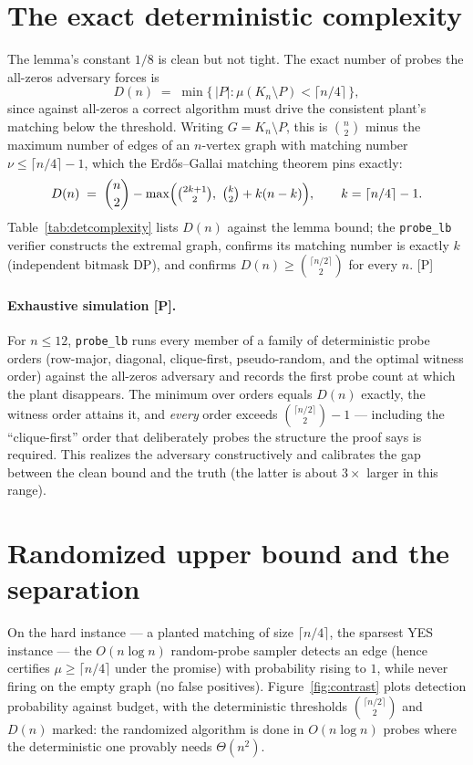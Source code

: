 \documentclass[11pt]{article}
\newcommand{\statusP}{\textsf{\footnotesize[P]}}
\newcommand{\mm}{\mu}
\begin{document}
\section{The exact deterministic complexity}\label{sec:exact}

The lemma's constant $1/8$ is clean but not tight. The exact number of probes
the all-zeros adversary forces is
\[
  D(n)\;=\;\min\{\,|P| : \mm(K_n\setminus P)<\lceil n/4\rceil\,\},
\]
since against all-zeros a correct algorithm must drive the consistent plant's
matching below the threshold. Writing $G=K_n\setminus P$, this is
$\binom n2$ minus the maximum number of edges of an $n$-vertex graph with
matching number $\nu\le\lceil n/4\rceil-1$, which the Erd\H{o}s--Gallai
matching theorem \cite{EG59} pins exactly:
\[
  D(n)\;=\;\binom n2-\max\!\Big(\tbinom{2k+1}{2},\ \tbinom k2+k(n-k)\Big),
  \qquad k=\lceil n/4\rceil-1 .
\]
Table~\ref{tab:detcomplexity} lists $D(n)$ against the lemma bound; the
\texttt{probe\_lb} verifier constructs the extremal graph, confirms its
matching number is exactly $k$ (independent bitmask DP), and confirms
$D(n)\ge\binom{\lceil n/2\rceil}{2}$ for every $n$. \statusP



\paragraph{Exhaustive simulation \statusP.} For $n\le 12$, \texttt{probe\_lb}
runs every member of a family of deterministic probe orders (row-major,
diagonal, clique-first, pseudo-random, and the optimal witness order) against
the all-zeros adversary and records the first probe count at which the plant
disappears. The minimum over orders equals $D(n)$ exactly, the witness order
attains it, and \emph{every} order exceeds $\binom{\lceil n/2\rceil}{2}-1$ ---
including the ``clique-first'' order that deliberately probes the structure the
proof says is required. This realizes the adversary constructively and
calibrates the gap between the clean bound and the truth (the latter is about
$3\times$ larger in this range).

\section{Randomized upper bound and the separation}\label{sec:rand}

On the hard instance --- a planted matching of size $\lceil n/4\rceil$, the
sparsest YES instance --- the $O(n\log n)$ random-probe sampler detects an edge
(hence certifies $\mm\ge\lceil n/4\rceil$ under the promise) with probability
rising to $1$, while never firing on the empty graph (no false positives).
Figure~\ref{fig:contrast} plots detection probability against budget, with the
deterministic thresholds $\binom{\lceil n/2\rceil}{2}$ and $D(n)$ marked: the
randomized algorithm is done in $O(n\log n)$ probes where the deterministic one
provably needs $\Theta(n^2)$.
\end{document}
